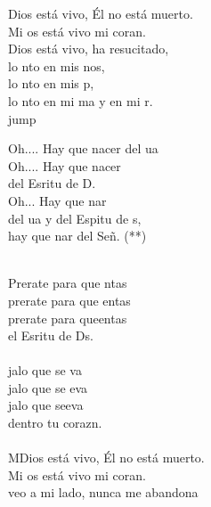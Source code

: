 \begin{cancion}%
	 Dios está vivo, Él no está muerto.\\
	Mi os está vivo mi coran. \\
	 Dios está vivo, ha resucitado,\\
	lo nto en mis nos,\\
	lo nto en mis p,\\
	lo nto en mi ma y en mi r.\\jump\\
	\begin{chorus}%
	Oh.... Hay que nacer del ua\\
	Oh.... Hay que nacer\\
	del Esritu de D. \\
	Oh... Hay que nar\\
	del ua y del Espitu de s,\\
	hay que nar del Señ. (**) \\
	\end{chorus}%
	\jump\\
	Prerate para que ntas \\
	prerate para que entas \\
	prerate para queentas\\
	el Esritu de Ds. \\
	\jump\\
	jalo que se va \\
	jalo que se eva \\
	jalo que seeva\\
	dentro  tu corazn.\\
	\jump\\
	MDios está vivo, Él no está muerto.\\
	Mi os está vivo mi coran. \\
	 veo a mi lado, nunca me abandona\\

\end{cancion}
